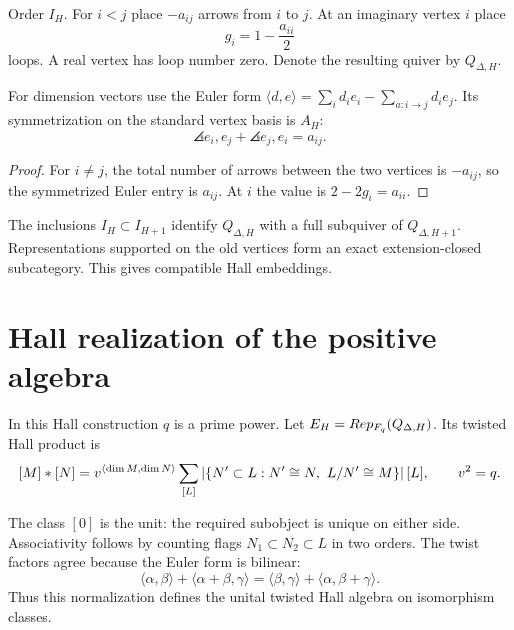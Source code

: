 \begin{construction}
Order $I_H$.  For $i<j$ place $-a_{ij}$ arrows from $i$ to $j$.  At an imaginary vertex $i$ place
\[
 g_i=1-\frac{a_{ii}}2
\]
loops.  A real vertex has loop number zero.  Denote the resulting quiver by $Q_{\Delta,H}$.
\end{construction}

\begin{proposition}
For dimension vectors use the Euler form
$\langle d,e\rangle=\sum_i d_ie_i-\sum_{a:i\to j}d_ie_j$.
Its symmetrization on the standard vertex basis is $A_H$:
\[
 \angles{e_i,e_j}+\angles{e_j,e_i}=a_{ij}.
\]
\end{proposition}
\begin{proof}
For $i\ne j$, the total number of arrows between the two vertices is $-a_{ij}$, so the symmetrized Euler entry is $a_{ij}$.  At $i$ the value is $2-2g_i=a_{ii}$.
\end{proof}

The inclusions $I_H\subset I_{H+1}$ identify $Q_{\Delta,H}$ with a full subquiver of $Q_{\Delta,H+1}$.  Representations supported on the old vertices form an exact extension-closed subcategory.  This gives compatible Hall embeddings.


\section{Hall realization of the positive algebra}
In this Hall construction $q$ is a prime power. Let
$E_H=Rep_{F_q}(Q_{\Delta,H})$. Its twisted Hall product is
\[
 [M]*[N]
 =v^{\langle \dim M,\dim N\rangle}
 \sum_{[L]}
 \left|\left\{N'\subset L:N'\cong N,\ L/N'\cong M\right\}\right|
 [L],
 \qquad v^2=q.
\]

The class $[0]$ is the unit: the required subobject is unique on either
side. Associativity follows by counting flags $N_1\subset N_2\subset L$
in two orders. The twist factors agree because the Euler form is
bilinear:
\[
 \langle\alpha,\beta\rangle+\langle\alpha+\beta,\gamma\rangle
 =\langle\beta,\gamma\rangle+\langle\alpha,\beta+\gamma\rangle.
\]
Thus this normalization defines the unital twisted Hall algebra on
isomorphism classes.

